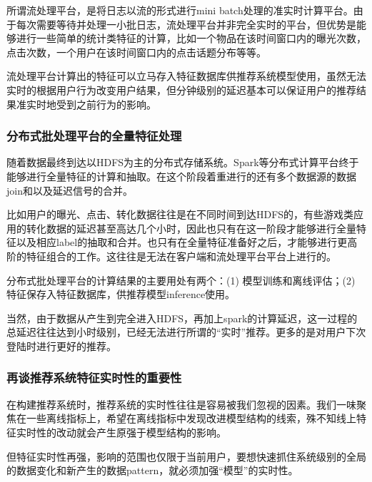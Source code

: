 \documentclass[12pt]{article}
\begin{document}
所谓流处理平台，是将日志以流的形式进行mini batch处理的准实时计算平台。由于每次需要等待并处理一小批日志，流处理平台并非完全实时的平台，但优势是能够进行一些简单的统计类特征的计算，比如一个物品在该时间窗口内的曝光次数，点击次数，一个用户在该时间窗口内的点击话题分布等等。

流处理平台计算出的特征可以立马存入特征数据库供推荐系统模型使用，虽然无法实时的根据用户行为改变用户结果，但分钟级别的延迟基本可以保证用户的推荐结果准实时地受到之前行为的影响。

\subsubsection{分布式批处理平台的全量特征处理}
随着数据最终到达以HDFS为主的分布式存储系统。Spark等分布式计算平台终于能够进行全量特征的计算和抽取。在这个阶段着重进行的还有多个数据源的数据join和以及延迟信号的合并。

比如用户的曝光、点击、转化数据往往是在不同时间到达HDFS的，有些游戏类应用的转化数据的延迟甚至高达几个小时，因此也只有在这一阶段才能够进行全量特征以及相应label的抽取和合并。也只有在全量特征准备好之后，才能够进行更高阶的特征组合的工作。这往往是无法在客户端和流处理平台平台上进行的。

分布式批处理平台的计算结果的主要用处有两个：(1) 模型训练和离线评估；(2) 特征保存入特征数据库，供推荐模型inference使用。

当然，由于数据从产生到完全进入HDFS，再加上spark的计算延迟，这一过程的总延迟往往达到小时级别，已经无法进行所谓的“实时”推荐。更多的是对用户下次登陆时进行更好的推荐。

\subsubsection{再谈推荐系统特征实时性的重要性}
在构建推荐系统时，推荐系统的实时性往往是容易被我们忽视的因素。我们一味聚焦在一些离线指标上，希望在离线指标中发现改进模型结构的线索，殊不知线上特征实时性的改动就会产生原强于模型结构的影响。

但特征实时性再强，影响的范围也仅限于当前用户，要想快速抓住系统级别的全局的数据变化和新产生的数据pattern，就必须加强“模型”的实时性。
\end{document}
